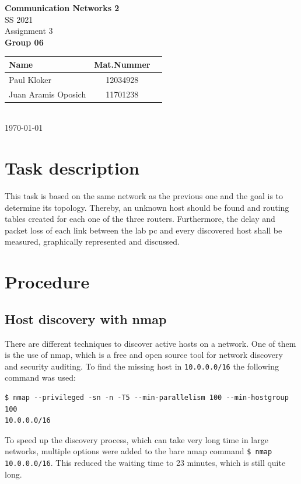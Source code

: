 \documentclass[parskip=full]{scrartcl}
\begin{document}
\begin{titlepage}
    \centering
    \vspace*{2cm}
    {\Huge \textbf{Communication Networks 2}}\\
    SS 2021\\
    \vspace*{1cm}
    {\Large Assignment 3}
    \\\vspace*{3cm}
    {\Large \textbf{Group 06}}\\
    \vspace*{1cm}
    {\large 
        \begin{tabular}{l c c}
            Name & Mat.Nummer \\ \hline
            Paul Kloker & 12034928 \\
            Juan Aramis Oposich & 11701238
        \end{tabular}
    }
    \\\vspace*{7cm}
    \today
\end{titlepage}

\section{Task description} \label{sec:task}
This task is based on the same network as the previous one and the goal is to determine its topology.
Thereby, an unknown host should be found and routing tables created for each one of the three routers.
Furthermore, the delay and packet loss of each link between the lab pc and every discovered host shall be measured, graphically represented and discussed.
\section{Procedure} \label{sec:procedure}

\subsection{Host discovery with nmap} \label{subsec:nmap}
There are different techniques to discover active hosts on a network.
One of them is the use of nmap, which is a free and open source tool for network discovery and security auditing.
To find the missing host in \verb|10.0.0.0/16| the following command was used:
\begin{verbatim}
$ nmap --privileged -sn -n -T5 --min-parallelism 100 --min-hostgroup 100 
10.0.0.0/16
\end{verbatim}
To speed up the discovery process, which can take very long time in large networks, multiple options were added to the bare nmap command \verb|$ nmap 10.0.0.0/16|.
This reduced the waiting time to 23 minutes, which is still quite long. 
\end{document}
